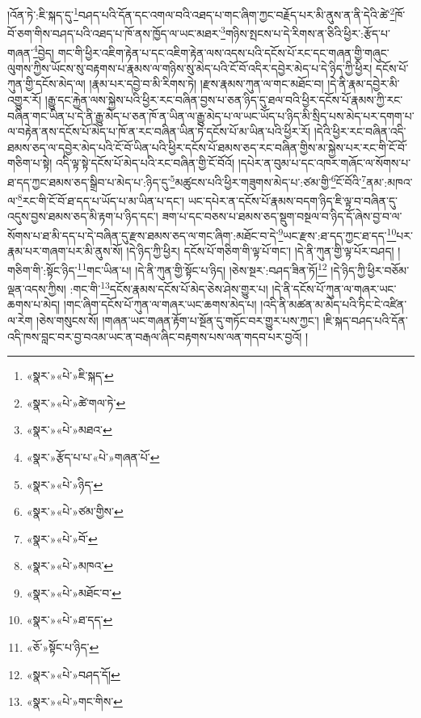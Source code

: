 །འོན་ཏེ་:ཇི་སྐད་དུ་\footnote{«སྣར་»«པེ་»ཇི་སྐད་}བཤད་པའི་དོན་དང་འགལ་བའི་འཐད་པ་གང་ཞིག་ཀྱང་བརྗོད་པར་མི་ནུས་ན་ནི་དེའི་ཚེ་\footnote{«སྣར་»«པེ་»ཚེ་གལ་ཏེ་}ཁོ་བོ་ཅག་གིས་བཤད་པའི་འཐད་པ་ཁོ་ནས་ཁྱོད་ལ་ཡང་མཐར་\footnote{«སྣར་»«པེ་»མཐའ་}གཉིས་སྤངས་པ་དེ་རིགས་ན་ཅིའི་ཕྱིར་:རྩོད་པ་གཞན་\footnote{«སྣར་»རྩོད་པ་པ་«པེ་»གཞན་པོ་}བྱེད། གང་གི་ཕྱིར་འཇིག་རྟེན་པ་དང་འཇིག་རྟེན་ལས་འདས་པའི་དངོས་པོ་རང་དང་གཞན་གྱི་གཞུང་ལུགས་ཀྱིས་ཡོངས་སུ་བརྟགས་པ་རྣམས་ལ་གཉིས་སུ་མེད་པའི་ངོ་བོ་འདིར་དབྱེར་མེད་པ་དེ་ཉིད་ཀྱི་ཕྱིར། དངོས་པོ་ཀུན་གྱི་དངོས་མེད་ལ། །རྣམ་པར་དབྱེ་བ་མི་རིགས་ཏེ། །རྫས་རྣམས་ཀུན་ལ་གང་མཐོང་བ། །དེ་ནི་རྣམ་དབྱེར་མི་འགྱུར་རོ། །རྒྱུ་དང་རྐྱེན་ལས་སྐྱེས་པའི་ཕྱིར་རང་བཞིན་བྱས་པ་ཅན་ཉིད་དུ་ཐལ་བའི་ཕྱིར་དངོས་པོ་རྣམས་ཀྱི་རང་བཞིན་གང་ཡིན་པ་དེ་ནི་རྒྱུ་མེད་པ་ཅན་ཁོ་ན་ཡིན་ལ་རྒྱུ་མེད་པ་ལ་ཡང་ཡོད་པ་ཉིད་མི་སྲིད་པས་མེད་པར་དགག་པ་ལ་བརྟེན་ནས་དངོས་པོ་མེད་པ་ཁོ་ན་རང་བཞིན་ཡིན་ཏེ་དངོས་པོ་མ་ཡིན་པའི་ཕྱིར་རོ། །དེའི་ཕྱིར་རང་བཞིན་འདི་ཐམས་ཅད་ལ་དབྱེར་མེད་པའི་ངོ་བོ་ཡིན་པའི་ཕྱིར་དངོས་པོ་ཐམས་ཅད་རང་བཞིན་གྱིས་མ་སྐྱེས་པར་རང་གི་ངོ་བོ་གཅིག་པ་སྟེ། འདི་ལྟ་སྟེ་དངོས་པོ་མེད་པའི་རང་བཞིན་གྱི་ངོ་བོའོ། །དཔེར་ན་བུམ་པ་དང་འཁར་གཞོང་ལ་སོགས་པ་ཐ་དད་ཀྱང་ཐམས་ཅད་སྒྲིབ་པ་མེད་པ་:ཉིད་དུ་\footnote{«སྣར་»«པེ་»ཉིད་}མཚུངས་པའི་ཕྱིར་གཟུགས་མེད་པ་:ཙམ་གྱི་\footnote{«སྣར་»«པེ་»ཙམ་གྱིས་}ངོ་བོའི་\footnote{«སྣར་»«པེ་»བོ་}ནམ་:མཁའ་ལ་\footnote{«སྣར་»«པེ་»མཁའ་}རང་གི་ངོ་བོ་ཐ་དད་པ་ཡོད་པ་མ་ཡིན་པ་དང་། ཡང་དཔེར་ན་དངོས་པོ་རྣམས་བདག་ཉིད་ཇི་ལྟ་བ་བཞིན་དུ་འདུས་བྱས་ཐམས་ཅད་མི་རྟག་པ་ཉིད་དང་། ཟག་པ་དང་བཅས་པ་ཐམས་ཅད་སྡུག་བསྔལ་བ་ཉིད་དོ་ཞེས་བྱ་བ་ལ་སོགས་པ་ཐ་མི་དད་པ་དེ་བཞིན་དུ་རྫས་ཐམས་ཅད་ལ་གང་ཞིག་:མཐོང་བ་དེ་\footnote{«སྣར་»«པེ་»མཐོང་བ་}ཡང་རྫས་:ཐ་དད་ཀྱང་ཐ་དད་\footnote{«སྣར་»«པེ་»ཐ་དད་}པར་རྣམ་པར་གཞག་པར་མི་ནུས་སོ། །དེ་ཉིད་ཀྱི་ཕྱིར། དངོས་པོ་གཅིག་གི་ལྟ་པོ་གང་། །དེ་ནི་ཀུན་གྱི་ལྟ་པོར་བཤད། །གཅིག་གི་:སྟོང་ཉིད་\footnote{«ཅོ་»སྟོང་པ་ཉིད་}གང་ཡིན་པ། །དེ་ནི་ཀུན་གྱི་སྟོང་པ་ཉིད། །ཅེས་སྔར་:བཤད་ཟིན་ཏོ།\footnote{«སྣར་»«པེ་»བཤད་དོ།} །དེ་ཉིད་ཀྱི་ཕྱིར་བཅོམ་ལྡན་འདས་ཀྱིས། :གང་གི་\footnote{«སྣར་»«པེ་»གང་གིས་}དངོས་རྣམས་དངོས་པོ་མེད་ཅེས་ཤེས་གྱུར་པ། །དེ་ནི་དངོས་པོ་ཀུན་ལ་གཞར་ཡང་ཆགས་པ་མེད། །གང་ཞིག་དངོས་པོ་ཀུན་ལ་གཞར་ཡང་ཆགས་མེད་པ། །འདི་ནི་མཚན་མ་མེད་པའི་ཏིང་ངེ་འཛིན་ལ་རེག །ཅེས་གསུངས་སོ། །གཞན་ཡང་གཞན་རྟོག་པ་སྔོན་དུ་གཏོང་བར་གྱུར་པས་ཀྱང་། །ཇི་སྐད་བཤད་པའི་དོན་འདི་ཁས་བླང་བར་བྱ་བའམ་ཡང་ན་བརྒལ་ཞིང་བརྟགས་པས་ལན་གདབ་པར་བྱའོ། །
